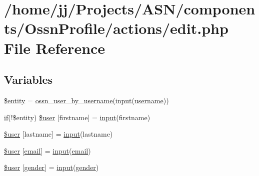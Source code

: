 \hypertarget{components_2_ossn_profile_2actions_2edit_8php}{}\section{/home/jj/\+Projects/\+A\+S\+N/components/\+Ossn\+Profile/actions/edit.php File Reference}
\label{components_2_ossn_profile_2actions_2edit_8php}
\subsection*{Variables}
\begin{DoxyCompactItemize}
\item 
\hyperlink{components_2_ossn_profile_2actions_2edit_8php_a74ed34e6d7bc9f3f8c4fb58a12247ee2}{\$entity} = \hyperlink{ossn_8lib_8users_8php_a77fdcb678aedd165af1f9f875645c864}{ossn\+\_\+user\+\_\+by\+\_\+username}(\hyperlink{ossn_8lib_8input_8php_a64ebee98b041c4f75f71ed3cd73cc8ed}{input}(\textquotesingle{}\hyperlink{actions_2account_8php_ac9b3768ccc688c2ff0811c50c107a02e}{username}\textquotesingle{}))
\item 
\hyperlink{jquery_8tokeninput_8js_ad8dd46a3cbc004569e34401e9e71771a}{if}(!\$entity) \hyperlink{components_2_ossn_profile_2actions_2edit_8php_aac0a0d9be0cd7bff33c25dc23bc48f69}{\$user} \mbox{[}\textquotesingle{}firstname\textquotesingle{}\mbox{]} = \hyperlink{ossn_8lib_8input_8php_a64ebee98b041c4f75f71ed3cd73cc8ed}{input}(\textquotesingle{}firstname\textquotesingle{})
\item 
\hyperlink{components_2_ossn_profile_2actions_2edit_8php_a1187774c6d9942181216e0839e5e73bc}{\$user} \mbox{[}\textquotesingle{}lastname\textquotesingle{}\mbox{]} = \hyperlink{ossn_8lib_8input_8php_a64ebee98b041c4f75f71ed3cd73cc8ed}{input}(\textquotesingle{}lastname\textquotesingle{})
\item 
\hyperlink{components_2_ossn_profile_2actions_2edit_8php_ae9de5cc5ae3fec81bb110d3a77ad7eec}{\$user} \mbox{[}\textquotesingle{}\hyperlink{actions_2account_8php_a011c66ae212438e0d7de7c0e40451bb3}{email}\textquotesingle{}\mbox{]} = \hyperlink{ossn_8lib_8input_8php_a64ebee98b041c4f75f71ed3cd73cc8ed}{input}(\textquotesingle{}\hyperlink{actions_2account_8php_a011c66ae212438e0d7de7c0e40451bb3}{email}\textquotesingle{})
\item 
\hyperlink{components_2_ossn_profile_2actions_2edit_8php_a332175f698fc3f3621ba3c118bbc1d47}{\$user} \mbox{[}\textquotesingle{}\hyperlink{actions_2account_8php_a44147631c08dfda5f5bf50dc774f7090}{gender}\textquotesingle{}\mbox{]} = \hyperlink{ossn_8lib_8input_8php_a64ebee98b041c4f75f71ed3cd73cc8ed}{input}(\textquotesingle{}\hyperlink{actions_2account_8php_a44147631c08dfda5f5bf50dc774f7090}{gender}\textquotesingle{})

\end{DoxyCompactItemize}
